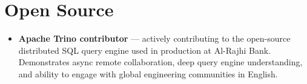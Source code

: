 \section{Open Source}

\begin{itemize}
  \item \textbf{Apache Trino contributor} --- actively contributing to the open-source
        distributed SQL query engine used in production at Al-Rajhi Bank. Demonstrates
        async remote collaboration, deep query engine understanding, and ability to engage
        with global engineering communities in English.
\end{itemize}
